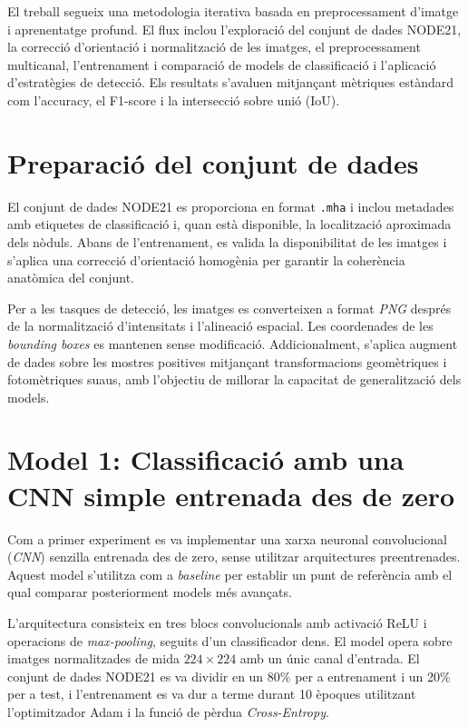 \documentclass[conference]{IEEEtran}
\begin{document}
El treball segueix una metodologia iterativa basada en preprocessament d’imatge i aprenentatge profund. El flux inclou l’exploració del conjunt de dades NODE21, la correcció d’orientació i normalització de les imatges, el preprocessament multicanal, l’entrenament i comparació de models de classificació i l’aplicació d’estratègies de detecció. Els resultats s’avaluen mitjançant mètriques estàndard com l’accuracy, el F1-score i la intersecció sobre unió (IoU).

\section{Preparació del conjunt de dades}

El conjunt de dades NODE21 es proporciona en format \texttt{.mha} i inclou metadades amb etiquetes de classificació i, quan està disponible, la localització aproximada dels nòduls. Abans de l’entrenament, es valida la disponibilitat de les imatges i s’aplica una correcció d’orientació homogènia per garantir la coherència anatòmica del conjunt.

Per a les tasques de detecció, les imatges es converteixen a format \textit{PNG} després de la normalització d’intensitats i l’alineació espacial. Les coordenades de les \textit{bounding boxes} es mantenen sense modificació. Addicionalment, s’aplica augment de dades sobre les mostres positives mitjançant transformacions geomètriques i fotomètriques suaus, amb l’objectiu de millorar la capacitat de generalització dels models.




\section{{ \textbf{Model 1: Classificació amb una CNN simple entrenada des de zero}}}

Com a primer experiment es va implementar una xarxa neuronal convolucional (\textit{CNN}) senzilla entrenada des de zero, sense utilitzar arquitectures preentrenades. Aquest model s’utilitza com a \textit{baseline} per establir un punt de referència amb el qual comparar posteriorment models més avançats.

L’arquitectura consisteix en tres blocs convolucionals amb activació ReLU i operacions de \textit{max-pooling}, seguits d’un classificador dens. El model opera sobre imatges normalitzades de mida $224 \times 224$ amb un únic canal d’entrada. El conjunt de dades NODE21 es va dividir en un 80\% per a entrenament i un 20\% per a test, i l’entrenament es va dur a terme durant 10 èpoques utilitzant l’optimitzador Adam i la funció de pèrdua \textit{Cross-Entropy}.
\end{document}
